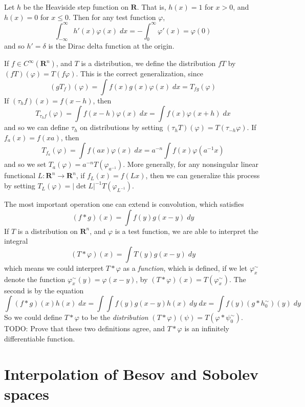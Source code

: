 \begin{example}
	Let $h$ be the Heaviside step function on $\mathbf{R}$. That is, $h(x) = 1$ for $x > 0$, and $h(x) = 0$ for $x \leq 0$. Then for any test function $\varphi$,
	\[ \int_{-\infty}^\infty h'(x) \varphi(x)\; dx = - \int_0^\infty \varphi'(x) = \varphi(0) \]
	and so $h' = \delta$ is the Dirac delta function at the origin.
\end{example}

If $f \in C^\infty(\mathbf{R}^n)$, and $T$ is a distribution, we define the distribution $fT$ by $(fT)(\varphi) = T(f \varphi)$. This is the correct generalization, since
%
\[ (gT_f)(\varphi) = \int f(x) g(x) \varphi(x)\; dx = T_{fg}(\varphi) \]
%
If $(\tau_h f)(x) = f(x - h)$, then
%
\[ T_{\tau_h f}(\varphi) = \int f(x - h) \varphi(x)\; dx = \int f(x) \varphi(x + h)\; dx \]
%
and so we can define $\tau_h$ on distributions by setting $(\tau_h T)(\varphi) = T(\tau_{-h} \varphi)$. If $f_a(x) = f(xa)$, then
%
\[ T_{f_a}(\varphi) = \int f(ax) \varphi(x)\; dx = a^{-n} \int f(x) \varphi(a^{-1} x) \]
%
and so we set $T_a(\varphi) = a^{-n} T(\varphi_{a^{-1}})$. More generally, for any nonsingular linear functional $L: \mathbf{R}^n \to \mathbf{R}^n$, if $f_L(x) = f(Lx)$, then we can generalize this process by setting $T_L(\varphi) = |\det L|^{-1} T(\varphi_{L^{-1}})$.

The most important operation one can extend is convolution, which satisfies
%
\[ (f * g)(x) = \int f(y) g(x - y)\; dy \]
%
If $T$ is a distribution on $\mathbf{R}^n$, and $\varphi$ is a test function, we are able to interpret the integral
%
\[ (T * \varphi)(x) = \int T(y) g(x - y)\; dy \]
%
which means we could interpret $T * \varphi$ as a {\it function}, which is defined, if we let $\varphi^\sim_x$ denote the function $\varphi^\sim_x(y) = \varphi(x-y)$, by $(T * \varphi)(x) = T(\varphi^\sim_x)$. The second is by the equation
%
\[ \int (f * g)(x) h(x)\; dx = \int \int f(y) g(x-y) h(x)\; dy\; dx = \int f(y) (g * h^\sim_0)(y)\; dy \]
%
So we could define $T * \varphi$ to be the {\it distribution} $(T * \varphi)(\psi) = T(\varphi * \psi^\sim_0)$. TODO: Prove that these two definitions agree, and $T * \varphi$ is an infinitely differentiable function.

\chapter{Interpolation of Besov and Sobolev spaces}

